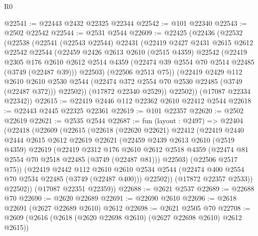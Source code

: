 \begin{lexlean}{R0}
\begin{coremodule}
@22541 := @22443 @2432 @22325 @22344
@22542 := @101 @22340
@22543 := @2502 @22542
@22544 := @2531 @2544
@22609 := @22425
    (@22436
      (@22532
        (@22538
          (@22541
            (@22543 @22544)
            @22431
            (@22419
              @2427
              @2431
              @2615
              @2612
              @22542
              @22544
              (@22459
                @2426
                @2613
                @2610
                (@2515 @4359)
                @22542
                (@22419
                  @2305
                  @176
                  @2610
                  @2612
                  @2514
                  @4359
                  (@22474 @39 @2554 @70 @2514 @22485 (@3749 (@22487 @39)))
                  @22503)
                (@22506 @2513 @75))
              (@22419
                @2429
                @112
                @2610
                @2610
                @2530
                @2544
                (@22474 @372 @2554 @70 @2530 @22485 (@3749 (@22487 @372)))
                @22502))
            (@17872 @22340 @2529))
          @22502))
      (@17087 @22334 @22342))
@22615 := @22419 @2446 @112 @22362 @2610 @22412 @2544
@22618 := @22443 @2445 @22325 @22361
@22619 := @101 @22357
@22620 := @2502 @22619
@22621 := @2535 @2544
@22687 := fun (layout : @2497) =>
  @22404
    (@22418
      (@22609
        (@22615
          (@22618
            (@22620 @22621)
            @22412
            (@22419
              @2440
              @2444
              @2615
              @2612
              @22619
              @22621
              (@22459
                @2439
                @2613
                @2610
                (@2519 @4359)
                @22619
                (@22419
                  @2312
                  @176
                  @2610
                  @2612
                  @2518
                  @4359
                  (@22474 @81 @2554 @70 @2518 @22485 (@3749 (@22487 @81)))
                  @22503)
                (@22506 @2517 @75))
              (@22419
                @2442
                @112
                @2610
                @2610
                @2534
                @2544
                (@22474 @400 @2554 @70 @2534 @22485 (@3749 (@22487 @400)))
                @22502))
            (@17872 @22357 @2533))
          @22502))
      (@17087 @22351 @22359))
@22688 := @2621 @2537
@22689 := @22688 @70
@22690 := @2620 @22689
@22691 := @22690 @2610
@22696 := @2618 @22691 (@2627 @22689 @2610) @2612
@22698 := @2621 @2505 @70
@22708 := @2609 (@2616 (@2618 (@2620 @22698 @2610) (@2627 @22698 @2610) @2612 @2615))

\end{coremodule}
\end{lexlean}
